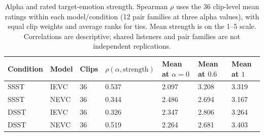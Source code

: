\begin{table}[t]
\centering\scriptsize
\caption{Alpha and rated target-emotion strength. Spearman $\rho$ uses the 36 clip-level mean ratings within each model/condition (12 pair families at three alpha values), with equal clip weights and average ranks for ties. Mean strength is on the 1--5 scale. Correlations are descriptive; shared listeners and pair families are not independent replications.}
\label{tab:alpha-strength}
\setlength{\tabcolsep}{5pt}
\renewcommand{\arraystretch}{1.15}
\begin{tabular}{|lllllll|}
\hline
Condition & Model & Clips & $\rho(\alpha,\mathrm{strength})$ & Mean at $\alpha=0$ & Mean at $0.6$ & Mean at $1$ \\
\hline
SSST & IEVC & 36 & 0.537 & 2.097 & 3.208 & 3.319 \\
SSST & NEVC & 36 & 0.344 & 2.486 & 2.694 & 3.167 \\
DSST & IEVC & 36 & 0.326 & 2.347 & 2.806 & 3.264 \\
DSST & NEVC & 36 & 0.519 & 2.264 & 2.681 & 3.403 \\
\hline
\end{tabular}
\end{table}
